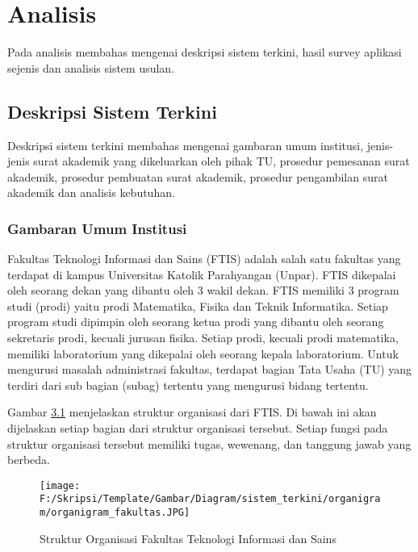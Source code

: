 \chapter{Analisis}
\label{chap:analisis}
Pada analisis membahas mengenai deskripsi sistem terkini, hasil survey aplikasi sejenis dan analisis sistem usulan.

\section{Deskripsi Sistem Terkini}
\label{sec:deskripsi_sistem_terkini}
Deskripsi sistem terkini membahas mengenai gambaran umum institusi, jenis-jenis surat akademik yang dikeluarkan oleh pihak TU, prosedur pemesanan surat akademik, prosedur pembuatan surat akademik, prosedur pengambilan surat akademik dan analisis kebutuhan. \\

\subsection{Gambaran Umum Institusi}
\label{sec:gambaran_umum_institusi}
Fakultas Teknologi Informasi dan Sains (FTIS) adalah salah satu fakultas yang terdapat di kampus Universitas Katolik Parahyangan (Unpar). FTIS dikepalai oleh seorang dekan yang dibantu oleh 3 wakil dekan. FTIS memiliki 3 program studi (prodi) yaitu prodi Matematika, Fisika dan Teknik Informatika. Setiap program studi dipimpin oleh seorang ketua prodi yang dibantu oleh seorang sekretaris prodi, kecuali jurusan fisika. Setiap prodi, kecuali prodi matematika, memiliki laboratorium yang dikepalai oleh seorang kepala laboratorium. Untuk mengurusi masalah administrasi fakultas, terdapat bagian Tata Usaha (TU) yang terdiri dari sub bagian (subag) tertentu yang mengurusi bidang tertentu.\

Gambar \hyperlink{organigram_fakultas}{3.1} menjelaskan struktur organisasi dari FTIS. Di bawah ini akan dijelaskan  setiap bagian dari struktur organisasi tersebut. Setiap fungsi pada struktur organisasi tersebut memiliki tugas, wewenang, dan tanggung jawab yang berbeda.
\begin{figure}[H]
	\centering
		\texttt{[image: F:/Skripsi/Template/Gambar/Diagram/sistem\_terkini/organigram/organigram\_fakultas.JPG]}
	\caption{Struktur Organisasi Fakultas Teknologi Informasi dan Sains}
	\label{fig:organigram_fakultas}
\end{figure}

